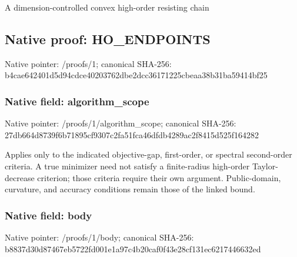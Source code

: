 \documentclass[10pt,a4paper]{article}
\begin{document}
\begingroup\raggedright\sloppy A dimension-controlled convex high-order resisting chain\par\endgroup

\subsection{Native proof: HO\_\allowbreak{}ENDPOINTS}
Native pointer: /proofs/1; canonical SHA-256: b4cae642401d5d94cdce40203762dbe2dcc36171225cbeaa38b31ba59414bf25

\subsubsection{Native field: algorithm\_\allowbreak{}scope}
Native pointer: /proofs/1/algorithm\_\allowbreak{}scope; canonical SHA-256: 27db664d8739f6b71895cf9307c2fa51fca46dfdb4289ac2f8415d525f164282

\begingroup\raggedright\sloppy Applies only to the indicated objective-gap,\allowbreak{} first-order,\allowbreak{} or spectral second-order criteria. A true minimizer need not satisfy a finite-radius high-order Taylor-decrease criterion;\allowbreak{} those criteria require their own argument. Public-domain,\allowbreak{} curvature,\allowbreak{} and accuracy conditions remain those of the linked bound.\par\endgroup

\subsubsection{Native field: body}
Native pointer: /proofs/1/body; canonical SHA-256: b8837d30d87467eb5722fd001e1a97c4b20caf0f43e28cf131ec6217446632ed
\end{document}
